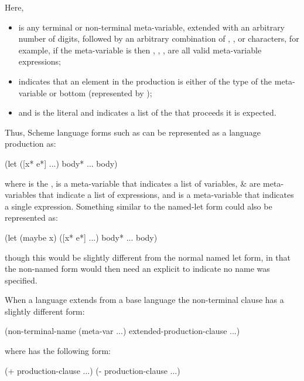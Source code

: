 \documentclass[letterpaper,10pt]{article}
\begin{document}
Here,
\begin{itemize}
\item {} is any terminal or non-terminal meta-variable,
extended with an arbitrary number of digits, followed by an arbitrary
combination of \scheme{*}, , or \scheme{^} characters, for example,
if the meta-variable is  then , , ,
 are all valid meta-variable expressions;
\item {}\scheme{)} indicates that an element in the
production is either of the type of the meta-variable or bottom (represented by
);
\item and  is the literal  and indicates a list of
the  that proceeds it is expected.
\end{itemize}
Thus, Scheme language forms such as  can be represented as a
language production as:

\begin{schemedisplay}
(let ([x* e*] ...) body* ... body)
\end{schemedisplay}

where  is the ,  is a meta-variable that
indicates a list of variables,  \&  are meta-variables
that indicate a list of expressions, and  is a meta-variable that
indicates a single expression.
Something similar to the named-let form could also be represented as:

\begin{schemedisplay}
(let (maybe x) ([x* e*] ...) body* ... body)
\end{schemedisplay}

though this would be slightly different from the normal named let form, in that
the non-named form would then need an explicit  to indicate no name
was specified.

When a language extends from a base language the non-terminal clause has a
slightly different form:

\begin{schemedisplay}
(non-terminal-name (meta-var ...)
  extended-production-clause
  ...)
\end{schemedisplay}

where  has the following form:

\begin{schemedisplay}
(+ production-clause ...)
(- production-clause ...)
\end{schemedisplay}
\end{document}
